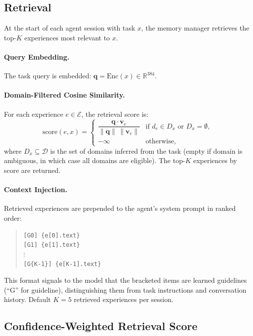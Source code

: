 \subsection{Retrieval}
\label{sec:retrieval}

At the start of each agent session with task $x$, the memory manager retrieves
the top-$K$ experiences most relevant to $x$.

\paragraph{Query Embedding.}
The task query is embedded: $\bm{q} = \text{Enc}(x) \in \mathbb{R}^{384}$.

\paragraph{Domain-Filtered Cosine Similarity.}
For each experience $e \in \mathcal{E}$, the retrieval score is:
\begin{equation}
    \text{score}(e, x) =
    \begin{cases}
        \dfrac{\bm{q} \cdot \bm{v}_e}{\|\bm{q}\|\,\|\bm{v}_e\|} & \text{if } d_e \in D_x \text{ or } D_x = \emptyset, \\
        -\infty & \text{otherwise,}
    \end{cases}
    \label{eq:retrieval-score}
\end{equation}
where $D_x \subseteq \mathcal{D}$ is the set of domains inferred from the task
(empty if domain is ambiguous, in which case all domains are eligible). The
top-$K$ experiences by score are returned.

\paragraph{Context Injection.}
Retrieved experiences are prepended to the agent's system prompt in ranked order:
\begin{quote}
\texttt{[G0] \{e[0].text\}}\\
\texttt{[G1] \{e[1].text\}}\\
$\vdots$\\
\texttt{[G\{K-1\}] \{e[K-1].text\}}
\end{quote}
This format signals to the model that the bracketed items are learned
guidelines (``G'' for guideline), distinguishing them from task instructions
and conversation history. Default $K = 5$ retrieved experiences per session.

\subsection{Confidence-Weighted Retrieval Score}

